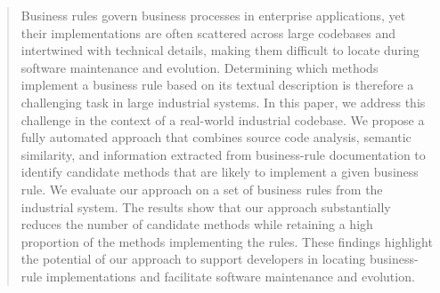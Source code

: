 \begin{abstract}

Business rules govern business processes in enterprise applications, yet their implementations are often scattered across large codebases and intertwined with technical details, making them difficult to locate during software maintenance and evolution. Determining which methods implement a business rule based on its textual description is therefore a challenging task in large industrial systems. 
In this paper, we address this challenge in the context of a real-world industrial codebase. We propose a fully automated approach that combines source code analysis, semantic similarity, and information extracted from business-rule documentation to identify candidate methods that are likely to implement a given business rule. We evaluate our approach on a set of business rules from the industrial system. The results show that our approach substantially reduces the number of candidate methods while retaining a high proportion of the methods implementing the rules. These findings highlight the potential of our approach to support developers in locating business-rule implementations and facilitate software maintenance and evolution.

\end{abstract}